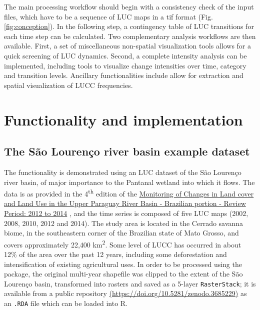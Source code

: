 The main processing workflow should begin with a consistency check of
the input files, which have to be a sequence of LUC maps in a tif format
(Fig. \ref{fig:conception}). In the following step, a contingency table
of LUC transitions for each time step can be calculated. Two
complementary analysis workflows are then available. First, a set of
miscellaneous non-spatial visualization tools allows for a quick
screening of LUC dynamics. Second, a complete intensity analysis
\citep{Aldwaik2012, Aldwaik2013} can be implemented, including tools to
visualize change intensities over time, category and transition levels.
Ancillary functionalities include allow for extraction and spatial
visualization of LUCC frequencies.

\hypertarget{functionality-and-implementation}{%
\section{Functionality and
implementation}\label{functionality-and-implementation}}

\hypertarget{the-suxe3o-lourenuxe7o-river-basin-example-dataset}{%
\subsection{The São Lourenço river basin example
dataset}\label{the-suxe3o-lourenuxe7o-river-basin-example-dataset}}

The  functionality is demonstrated using an LUC dataset of the
São Lourenço river basin, of major importance to the Pantanal wetland
into which it flows. The data is as provided in the
4\textsuperscript{th} edition of the
\href{https://www.embrapa.br/pantanal/bacia-do-alto-paraguai}{Monitoring
of Changes in Land cover and Land Use in the Upper Paraguay River Basin
- Brazilian portion - Review Period: 2012 to 2014}
\citep{sospantanal2015}, and the time series is composed of five
LUC maps (2002, 2008, 2010, 2012 and 2014). The study area is located in
the Cerrado savanna biome, in the southeastern corner of the Brazilian
state of Mato Grosso, and covers approximately 22,400
km\textsuperscript{2}. Some level of LUCC has occurred in about 12\% of
the area over the past 12 years, including some deforestation and
intensification of existing agricultural uses. In order to be processed
using the  package, the original multi-year shapefile was
clipped to the extent of the São Lourenço basin, transformed into
rasters and saved as a 5-layer \texttt{RasterStack}; it is available
from a public repository
\href{https://zenodo.org/record/3685230\#.Xl7cDMgReUk}{(https://doi.org/10.5281/zenodo.3685229)}
as an \texttt{.RDA} file which can be loaded into R.


